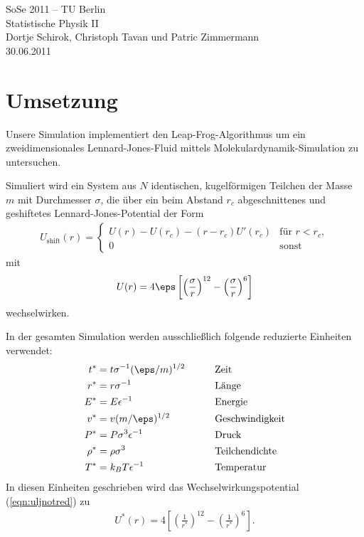 \documentclass[11pt,a4paper]{article}
\newcommand{\ind}[1]{_{\mathrm{#1}}}
\begin{document}

\begin{center}
SoSe 2011 -- TU Berlin\\
Statistische Physik II\\
Dortje Schirok, Christoph Tavan und Patric Zimmermann\\
30.06.2011
\end{center}

\section{Umsetzung}
Unsere Simulation implementiert den Leap-Frog-Algorithmus um ein zweidimensionales Lennard-Jones-Fluid mittels Molekulardynamik-Simulation zu untersuchen.

Simuliert wird ein System aus $N$ identischen, kugelförmigen Teilchen der Masse $m$ mit Durchmesser $\sigma$, die über ein beim Abstand $r_c$ abgeschnittenes und geshiftetes Lennard-Jones-Potential der Form
\begin{align}
	U\ind{shift}(r) = 
	\begin{cases} 
	U(r) - U(r_c) - (r - r_c) U'(r_c) & \text{für $r < r_c$},\\ 
	0& \text{sonst}
	\end{cases}
\end{align}
mit
\begin{align}
	U(r)=4 \eps \left[ \left( \frac{\sigma}{r}  \right)^{12} - \left( \frac{\sigma}{r}  \right)^6 \right] \label{eqn:uljnotred}
\end{align}
wechselwirken.

In der gesamten Simulation werden ausschließlich folgende reduzierte Einheiten verwendet:
\begin{alignat*}{2}
t^* &= t \sigma^{-1} (\eps/m)^{1/2} &\quad\quad&\text{Zeit}\\
r^* &= r \sigma^{-1} &\quad\quad&\text{Länge}\\
E^* &= E \epsilon^{-1} &&\text{Energie}\\
v^* &= v (m/\eps)^{1/2} &\quad\quad&\text{Geschwindigkeit}\\
P^* &= P \sigma^3 \epsilon^{-1} &&\text{Druck}\\
\rho^* &= \rho \sigma^3 && \text{Teilchendichte}\\
T^* &= k_B T \epsilon^{-1} && \text{Temperatur}
\end{alignat*}
In diesen Einheiten geschrieben wird das Wechselwirkungspotential (\ref{eqn:uljnotred}) zu
\begin{align}
	U^*(r) = 4 \left[ \left( \frac{1}{r^*}  \right)^{12} - \left( \frac{1}{r^*}  \right)^6 \right] \label{eqn:ulj}.
\end{align}
\end{document}
